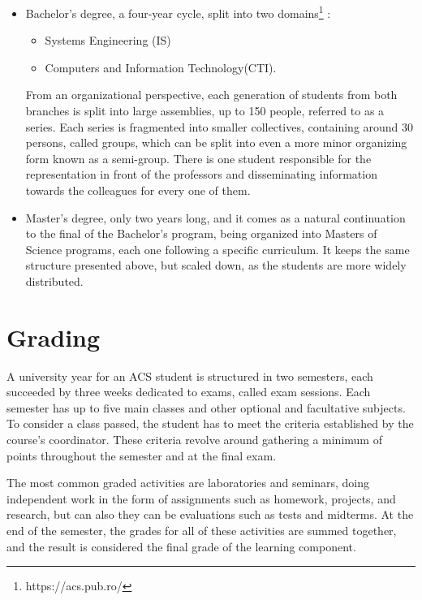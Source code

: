 \begin{itemize}
            \setlength{\topsep}{0.5pt}
            \setlength{\itemsep}{0.5pt}
            \setlength{\parsep}{0.5pt}
 \item Bachelor’s degree, a four-year cycle, split into two domains\footnote{https://acs.pub.ro/} :
    \begin{itemize}
            \setlength{\topsep}{0.5pt}
            \setlength{\itemsep}{0.5pt}
            \setlength{\parsep}{0.5pt}
            \item Systems Engineering (IS)
            \item Computers and Information Technology(CTI).
            \end{itemize}

From an organizational perspective, each generation of students from both branches is split into large assemblies, up to 150 people, referred to as a series. Each series is fragmented into smaller collectives, containing around 30 persons, called groups, which can be split into even a more minor organizing form known as a semi-group. There is one student responsible for the representation in front of the professors and disseminating information towards the colleagues for every one of them.

 \item Master’s degree, only two years long, and it comes as a natural continuation to the final of the Bachelor’s program, being organized into Masters of Science programs, each one following a specific curriculum. It keeps the same structure presented above, but scaled down, as the students are more widely distributed.
\end{itemize}

\section{Grading} \label{2:grading}

A university year for an ACS student is structured in two semesters, each succeeded by three weeks dedicated to exams, called exam sessions.
Each semester has up to five main classes and other optional and facultative subjects. To consider a class passed, the student has to meet the criteria established by the course’s coordinator. These criteria revolve around gathering a minimum of points throughout the semester and at the final exam.

The most common graded activities are laboratories and seminars, doing independent work in the form of assignments such as homework, projects, and research, but can also they can be evaluations such as tests and midterms. At the end of the semester, the grades for all of these activities are summed together, and the result is considered the final grade of the learning component.

